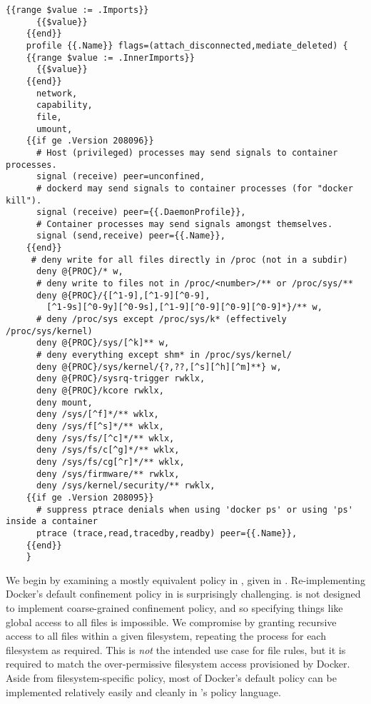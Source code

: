 \begin{lstlisting}[language=none, gobble=4,
  caption={[Docker's default AppArmor template]
    Docker's default AppArmor template~\cite{docker_default_apparmor}, at the time of
    writing this thesis. Docker uses Go's string templating syntax to modify the AppArmor
    profile according to the current Docker version and container metadata.
  },
  label={lst:docker-default}, float]
    {{range $value := .Imports}}
      {{$value}}
    {{end}}
    profile {{.Name}} flags=(attach_disconnected,mediate_deleted) {
    {{range $value := .InnerImports}}
      {{$value}}
    {{end}}
      network,
      capability,
      file,
      umount,
    {{if ge .Version 208096}}
      # Host (privileged) processes may send signals to container processes.
      signal (receive) peer=unconfined,
      # dockerd may send signals to container processes (for "docker kill").
      signal (receive) peer={{.DaemonProfile}},
      # Container processes may send signals amongst themselves.
      signal (send,receive) peer={{.Name}},
    {{end}}
     # deny write for all files directly in /proc (not in a subdir)
      deny @{PROC}/* w,
      # deny write to files not in /proc/<number>/** or /proc/sys/**
      deny @{PROC}/{[^1-9],[^1-9][^0-9],
        [^1-9s][^0-9y][^0-9s],[^1-9][^0-9][^0-9][^0-9]*}/** w,
      # deny /proc/sys except /proc/sys/k* (effectively /proc/sys/kernel)
      deny @{PROC}/sys/[^k]** w,
      # deny everything except shm* in /proc/sys/kernel/
      deny @{PROC}/sys/kernel/{?,??,[^s][^h][^m]**} w,
      deny @{PROC}/sysrq-trigger rwklx,
      deny @{PROC}/kcore rwklx,
      deny mount,
      deny /sys/[^f]*/** wklx,
      deny /sys/f[^s]*/** wklx,
      deny /sys/fs/[^c]*/** wklx,
      deny /sys/fs/c[^g]*/** wklx,
      deny /sys/fs/cg[^r]*/** wklx,
      deny /sys/firmware/** rwklx,
      deny /sys/kernel/security/** rwklx,
    {{if ge .Version 208095}}
      # suppress ptrace denials when using 'docker ps' or using 'ps' inside a container
      ptrace (trace,read,tracedby,readby) peer={{.Name}},
    {{end}}
    }
\end{lstlisting}

We begin by examining a mostly equivalent policy in \bpfbox{}, given in
.  Re-implementing Docker's default confinement policy in
\bpfbox{} is surprisingly challenging. \bpfbox{} is not designed to implement
coarse-grained confinement policy, and so specifying things like global access to all
files is impossible. We compromise by granting recursive access to all files within
a given filesystem, repeating the process for each filesystem as required. This is
\textit{not} the intended use case for \bpfbox{} file rules, but it is required to match
the over-permissive filesystem access provisioned by Docker. Aside from
filesystem-specific policy, most of Docker's default policy can be implemented relatively
easily and cleanly in \bpfbox{}'s policy language.

